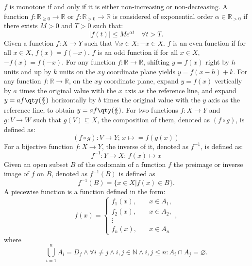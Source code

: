 \documentclass[a4paper,12pt]{report}
\begin{document}
$f$ is monotone if and only if it is either non-increasing or non-decreasing.
A function $f\colon\mathbb{R}_{\geq 0}\to\mathbb{R}$ or $f\colon\mathbb{R}_{>0}\to\mathbb{R}$ is considered of exponential order $\alpha\in\mathbb{R}_{>0}$ if there exists $M>0$ and $T>0$ such that:
\[|f(t)|\leq Me^{\alpha t}\quad \forall t>T.\]
Given a function $f\colon X\to Y$ such that $\forall x\in X\colon -x\in X$.
$f$ is an even function if for all $x\in X$, $f(x)=f(-x)$.
$f$ is an odd function if for all $x\in X$, $-f(x)=f(-x)$.
For any function $f\colon\mathbb{R}\to\mathbb{R}$, shifting $y=f(x)$ right by $h$ units and up by $k$ units on the $xy$ coordinate plane yields $y=f(x-h)+k$.
For any function $f\colon\mathbb{R}\to\mathbb{R}$, on the $xy$ coordinate plane, expand $y=f(x)$ vertically by $a$ times the original value with the $x$ axis as the reference line, and expand $y=af\qty(\frac{x}{b})$ horizontally by $b$ times the original value with the $y$ axis as the reference line, to obtain $y=af\qty(\frac{x}{b})$.
For two functions $f\colon X\to Y$ and $g\colon V\to W$ such that $g(V)\subseteq X$, the composition of them, denoted as $(f\circ g)$, is defined as:
\[(f \circ g)\colon V\to Y;\,x\mapsto = f(g(x))\]
For a bijective function $f\colon X\to Y$, the inverse of it, denoted as $f^{-1}$, is defined as:
\[f^{-1}\colon Y\to X;\,f(x)\mapsto x\]
Given an open subset $B$ of the codomain of a function $f$ the preimage or inverse image of $f$ on $B$, denoted as $f^{-1}(B)$ is defined as
\[f^{-1}(B)=\{x\in X|f(x)\in B\}.\]
A piecewise function is a function defined in the form:
\[f(x) =
\begin{cases}
f_1(x), & \quad x\in A_1, \\
f_2(x), & \quad x\in A_2, \\
\vdots \\
f_n(x), & \quad x \in A_n
\end{cases},\]
where
\[\bigcup_{i=1}^nA_i=D_f\land\forall i\neq j\land i,j\in\mathbb{N}\land i,j\leq n\colon A_i\cap A_j=\varnothing.\]
\end{document}
